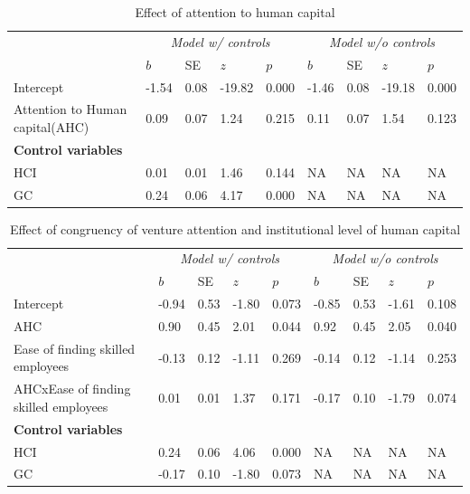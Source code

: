 \documentclass[
  english,
  man]{apa6}
\begin{document}
\begin{table}

\caption{\label{tab:unnamed-chunk-18}Effect of attention to human capital}
\centering
\begin{tabular}[t]{l|l|l|l|l|l|l|l|l}
\hline
\multicolumn{1}{c|}{\em{ }} & \multicolumn{4}{c|}{\em{Model w/ controls}} & \multicolumn{4}{c}{\em{Model w/o controls}} \\
\cline{2-5} \cline{6-9}
  & $b$ & SE & $z$ & $p$ & $b$ & SE & $z$ & $p$\\
\hline
Intercept & -1.54 & 0.08 & -19.82 & 0.000 & -1.46 & 0.08 & -19.18 & 0.000\\
\hline
Attention to Human capital(AHC) & 0.09 & 0.07 & 1.24 & 0.215 & 0.11 & 0.07 & 1.54 & 0.123\\
\hline
\multicolumn{9}{l}{\textbf{Control variables}}\\
\hline
\hspace{1em}HCI & 0.01 & 0.01 & 1.46 & 0.144 & NA & NA & NA & NA\\
\hline
\hspace{1em}GC & 0.24 & 0.06 & 4.17 & 0.000 & NA & NA & NA & NA\\
\hline
\end{tabular}
\end{table}

\begin{table}

\caption{\label{tab:unnamed-chunk-18}Effect of congruency of venture attention and institutional level of human capital}
\centering
\begin{tabular}[t]{l|l|l|l|l|l|l|l|l}
\hline
\multicolumn{1}{c|}{\em{ }} & \multicolumn{4}{c|}{\em{Model w/ controls}} & \multicolumn{4}{c}{\em{Model w/o controls}} \\
\cline{2-5} \cline{6-9}
  & $b$ & SE & $z$ & $p$ & $b$ & SE & $z$ & $p$\\
\hline
Intercept & -0.94 & 0.53 & -1.80 & 0.073 & -0.85 & 0.53 & -1.61 & 0.108\\
\hline
AHC & 0.90 & 0.45 & 2.01 & 0.044 & 0.92 & 0.45 & 2.05 & 0.040\\
\hline
Ease of finding skilled employees & -0.13 & 0.12 & -1.11 & 0.269 & -0.14 & 0.12 & -1.14 & 0.253\\
\hline
AHCxEase of finding skilled employees & 0.01 & 0.01 & 1.37 & 0.171 & -0.17 & 0.10 & -1.79 & 0.074\\
\hline
\multicolumn{9}{l}{\textbf{Control variables}}\\
\hline
\hspace{1em}HCI & 0.24 & 0.06 & 4.06 & 0.000 & NA & NA & NA & NA\\
\hline
\hspace{1em}GC & -0.17 & 0.10 & -1.80 & 0.073 & NA & NA & NA & NA\\
\hline
\end{tabular}
\end{table}
\end{document}
